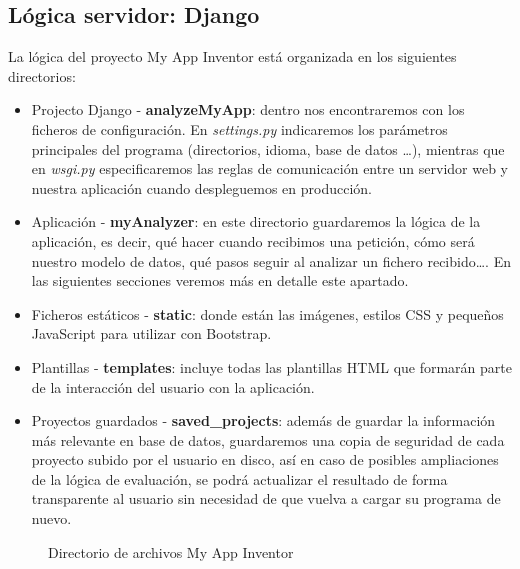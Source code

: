 \documentclass[a4paper, 12pt]{book}
\begin{document}
\subsection{Lógica servidor: Django}
La lógica del proyecto My App Inventor está organizada en los siguientes directorios:
\begin{itemize}
	\item Projecto Django - \textbf{analyzeMyApp}: dentro nos encontraremos con los ficheros de configuración. En \textit{settings.py} indicaremos los parámetros principales del programa (directorios, idioma, base de datos \ldots), mientras que en \textit{wsgi.py} especificaremos las reglas de comunicación entre un servidor web y nuestra aplicación cuando despleguemos en producción. 
	\item Aplicación - \textbf{myAnalyzer}: en este directorio guardaremos la lógica de la aplicación, es decir, qué hacer cuando recibimos una petición, cómo será nuestro modelo de datos, qué pasos seguir al analizar un fichero recibido\ldots. En las siguientes secciones veremos más en detalle este apartado.
	\item Ficheros estáticos - \textbf{static}: donde están las imágenes, estilos CSS y pequeños JavaScript para utilizar con Bootstrap.  
	\item Plantillas - \textbf{templates}: incluye todas las plantillas HTML que formarán parte de la interacción del usuario con la aplicación. 
	\item Proyectos guardados - \textbf{saved\_projects}: además de guardar la información más relevante en base de datos, guardaremos una copia de seguridad de cada proyecto subido por el usuario en disco, así en caso de posibles ampliaciones de la lógica de evaluación, se podrá actualizar el resultado de forma transparente al usuario sin necesidad de que vuelva a cargar su programa de nuevo. 
\end{itemize}  
\begin{figure}[H]
  \caption{Directorio de archivos My App Inventor}
  \label{fig:dirarchivos}
\end{figure}
\end{document}
